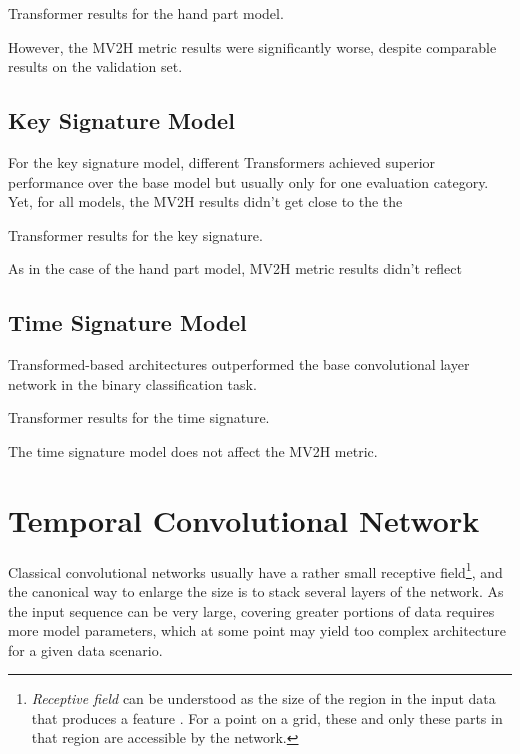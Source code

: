 \begin{table}[ht!]
\centering

\caption[Transformer results for the hand part model.]{Transformer results for the hand part model.}
\label{hand_part_transformer}
\end{table}

However, the MV2H metric results were significantly worse, despite comparable results on the validation set. 

\subsection{Key Signature Model}

For the key signature model, different Transformers achieved superior performance over the base model but usually only for one evaluation category. Yet, for all models, the MV2H results didn't get close to the the

\begin{table}[ht!]
\centering

\caption[Transformer results for the key signature.]{Transformer results for the key signature.}
\label{key_signature_transformer}
\end{table}

As in the case of the hand part model, MV2H metric results didn't reflect 

\subsection{Time Signature Model}

Transformed-based architectures outperformed the base convolutional layer network in the binary classification task.  

\begin{table}[ht!]
\centering

\caption[Transformer results for the time signature.]{Transformer results for the time signature.}
\label{time_signature_transformer}
\end{table}

The time signature model does not affect the MV2H metric.

\section{Temporal Convolutional Network}

Classical convolutional networks usually have a rather small receptive field\footnote{\emph{Receptive field} can be understood as the size of the region in the input data that produces a feature \cite{Araujo2019}. For a point on a grid, these and only these parts in that region are accessible by the network.}, and the canonical way to enlarge the size is to stack several layers of the network. As the input sequence can be very large, covering greater portions of data requires more model parameters, which at some point may yield too complex architecture for a given data scenario.

